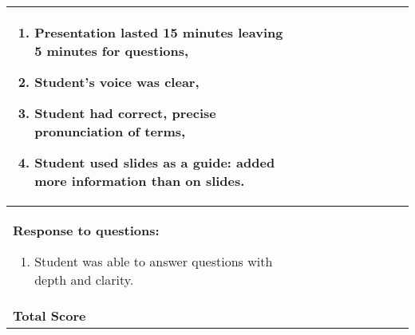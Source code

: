 \documentclass[10pt, twoside]{article}
\begin{document}
\begin{landscape}
{\begin{longtable}[l]{@{}L{5cm}|C{1.6cm}|C{1.6cm}|C{1.6cm}|C{1.6cm}|C{1.6cm}|C{1.6cm}|C{1.6cm}|C{1.6cm}|C{1.6cm}|@{}}
\begin{enumerate}[itemsep=-0.25\baselineskip,align=left, leftmargin=*]
\item Presentation lasted 15 minutes leaving 5 minutes for questions, \par%
\item Student’s voice was clear, \par%
\item Student had correct, precise pronunciation of terms,\par%
\item Student used slides as a guide: added more information than on slides.\end{enumerate}&%
& & & & & & & &\\[-1em]
\midrule
\textbf{Response to questions:}\par%
\vspace{-0.5\baselineskip}
\begin{enumerate}[itemsep=-0.25\baselineskip,align=left, leftmargin=*]
\item Student was able to answer questions with depth and clarity.\end{enumerate}&%
& & & & & & & &\\[-1em]
\midrule
\textbf{Total Score} & & & & & & & & & \\[2em]
\bottomrule
\end{longtable}
}%

\end{landscape}
\end{document}
